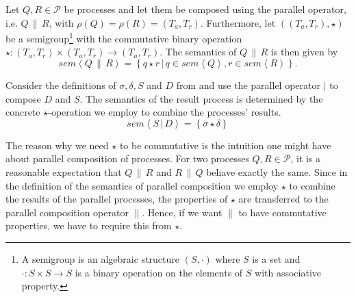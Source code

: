 \begin{definition}
\label{def:sem_parallel}
Let $Q, R \in \mathcal{P}$ be processes and let them be composed using the parallel operator, i.e. $Q \,\parallel\, R$, with $\rho \left( Q \right) = \rho \left( R \right) = \left( T_a, T_r \right)$. Furthermore, let $\left( \left( T_a, T_r \right), \star \right)$ be a semigroup\footnote{A semigroup is an algebraic structure $(S, \cdot)$ where $S$ is a set and $\cdot\colon S \times S \to S$ is a binary operation on the elements of $S$ with associative property.} with the commutative binary operation $\star \colon \left( T_a, T_r \right) \times \left( T_a, T_r \right) \to \left( T_a, T_r \right)$. The semantics of $Q \,\parallel\, R$ is then given by %
  \begin{equation}
    \label{eqn:sem_parallel}
    sem \left\langle Q \,\parallel\, R \right\rangle = \left\{ q \star r \,|\, q \in sem \left\langle Q \right\rangle, r \in sem \left\langle R \right\rangle \right\}.
  \end{equation}
  \hfill\qedsymbol
\end{definition}



\begin{example}
\label{exp:sem_parallel}
Consider the definitions of $\sigma, \delta, S$ and $D$ from  and use the parallel operator $|$ to compose $D$ and $S$. The semantics of the result process is determined by the concrete $\star$-operation we employ to combine the processes' results.
  \begin{equation}
    sem \left\langle S \,|\, D \right\rangle = \left\{ \sigma \star \delta \right\}
  \end{equation}
  \hfill\qedsymbol
\end{example}

The reason why we need $\star$ to be commutative is the intuition one might have about parallel composition of processes. For two processes $Q, R \in \mathcal{P}$, it is a reasonable expectation that $Q \,\parallel\, R$ and $R \,\parallel\, Q$ behave exactly the same. Since in the definition of the semantics of parallel composition we employ $\star$ to combine the results of the parallel processes, the properties of $\star$ are transferred to the parallel composition operator $\parallel$. Hence, if we want $\parallel$ to have commutative properties, we have to require this from $\star$.

